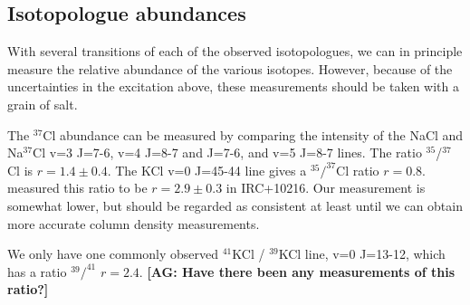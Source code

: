 \documentclass[twocolumn]{aastex62}
\newcommand{\bam}[1]{\textcolor{green!65!black}{\textbf{[BAM: #1]}}}
\newcommand{\ag}[1]{\textcolor{red!65!black}{\textbf{[AG: #1]}}}
\begin{document}
%

\subsection{Isotopologue abundances}
With several transitions of each of the observed isotopologues, we can in
principle measure the relative abundance of the various isotopes.  However,
because of the uncertainties in the excitation above, these measurements should
be taken with a grain of salt.

The $^{37}$Cl abundance can be measured by comparing the intensity of the
NaCl and Na$^{37}$Cl v=3 J=7-6, v=4 J=8-7 and J=7-6, and v=5 J=8-7 lines.
The ratio $^{35}$/$^{37}$Cl is $r=1.4\pm0.4$.  The KCl v=0 J=45-44 line
gives a $^{35}/^{37}$Cl ratio $r=0.8$.  \citet{Agundez2012a} measured
this ratio to be $r=2.9\pm0.3$ in IRC+10216.  Our measurement is somewhat lower,
but should be regarded as consistent at least until we can obtain more
accurate column density measurements.

We only have one commonly observed $^{41}$KCl / $^{39}$KCl line, v=0 J=13-12,
which has a ratio $^{39}/^{41}$ $r=2.4$.  \ag{Have there been any measurements
of this ratio?}
\end{document}
